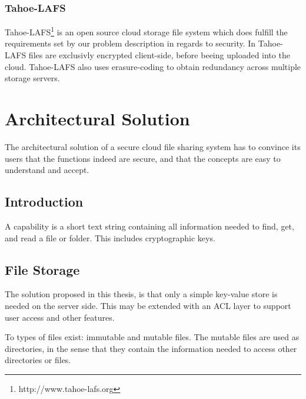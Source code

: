 \documentclass[english,12pt,a4paper]{book}
\begin{document}
\subsection{Tahoe-LAFS}
Tahoe-\ac{LAFS}\footnote{http://www.tahoe-lafs.org} is an open source
cloud storage file system which does fulfill the requirements set by our
problem description in regards to security. In Tahoe-\ac{LAFS} files are
exclusivly encrypted client-side, before beeing uploaded into the cloud.
Tahoe-\ac{LAFS} also uses erasure-coding to obtain redundancy across multiple
storage servers.  


\chapter{Architectural Solution}

The architectural solution of a secure cloud file sharing system has to convince
its users that the functions indeed are secure, and that the concepts are easy
to understand and accept.

\section{Introduction}
A capability is a short text string containing all information needed to find,
get, and read a file or folder. This includes cryptographic keys.



\section{File Storage}

The solution proposed in this thesis, is that only a simple key-value store is
needed on the server side. This may be extended with an \ac{ACL} layer to
support user access and other features.

To types of files exist: immutable and mutable files. The mutable files are used
as directories, in the sense that they contain the information needed to access
other directories or files.
\end{document}
